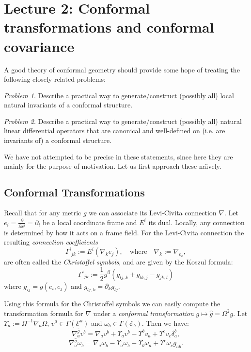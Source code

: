 \documentclass[a4paper,12pt]{amsart}
\newcommand{\om}{\omega}
\theoremstyle{remark}
\newtheorem{prob}{Problem}
\begin{document}
\section{Lecture 2: Conformal transformations and conformal covariance}

A good theory of conformal geometry should provide some hope of
treating the following closely related problems:
\begin{prob} Describe a practical way to generate/construct 
(possibly all)
local natural invariants of a conformal structure.
\end{prob}
\begin{prob} Describe a practical way to generate/construct 
(possibly all) natural linear differential operators that are canonical and well-defined on (i.e. are invariants of) a conformal structure.
\end{prob}
\noindent We have not attempted to be precise in these statements, since here they are mainly for the purpose of motivation. Let us first approach these na\"{\i}vely.

\subsection{Conformal Transformations} \label{n-one}

Recall that for any metric $g$ we can associate its Levi-Civita
connection $\nabla$. Let $e_i=\frac{\partial}{\partial
  x^i}=\partial_i$ be a local coordinate frame and $E^i$ its dual. Locally, any
connection is determined by how it acts on a frame field. For the Levi-Civita connection the resulting {\em connection coefficients}
$$
\Gamma^i_{\phantom{i}jk}:= E^i(\nabla_k e_j), \quad \mbox{where}\quad \nabla_k:=\nabla_{e_k} ,
$$ 
are often called the {\em Christoffel symbols}, and are given by the Koszul formula:
\begin{equation}\nonumber
\Gamma^i_{\phantom{i}jk}:= \frac{1}{2}g^{il}\left(g_{lj,k}+g_{lk,j}-g_{jk,l}\right)
\end{equation}
where $g_{ij}=g(e_i,e_j)$ and $g_{lj,k}=\partial_k g_{lj}$.

Using this formula for the Christoffel symbols we can easily compute
the transformation formula for $\nabla$ under a {\em conformal
  transformation} $g\mapsto \widehat{g}=\Omega^2 g$.  Let
$\Upsilon_a:=\Omega^{-1}\nabla_a\Omega$, $v^a\in\Gamma(\mathcal{E}^a)$
and $\om_b\in\Gamma(\mathcal{E}_b)$. Then we have:
\begin{equation}\label{eq:one}
\nabla^{\widehat{g}}_a v^b=\nabla_a v^b+\Upsilon_a v^b-\Upsilon^b v_a+\Upsilon^c v_c \delta_a^b,
\end{equation}
\begin{equation}\label{eq:two}
\nabla^{\widehat{g}}_a \om_b=\nabla_a \om_b-\Upsilon_a \om_b-\Upsilon_b \om_a+\Upsilon^c \om_c g_{a b} .
\end{equation}
\end{document}

